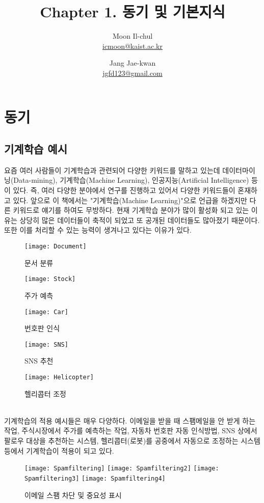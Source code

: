\documentclass[a4paper]{oblivoir}
\author{Moon Il-chul \\ \href{mailto:icmoon@kaist.ac.kr}{icmoon@kaist.ac.kr} 
   \and Jang Jae-kwan \\ \href{mailto:jgfd123@gmail.com}{jgfd123@gmail.com} }
\title{Chapter 1. 동기 및 기본지식}
\begin{document}
\maketitle
\tableofcontents

\section{동기}

\subsection{기계학습 예시}
요즘 여러 사람들이 기계학습과 관련되어 다양한 키워드를 말하고 있는데 데이터마이닝(Data-mining), 기계학습(Machine Learning), 인공지능(Artificial Intelligence) 등이 있다. 즉, 여러 다양한 분야에서 연구를 진행하고 있어서 다양한 키워드들이 혼재하고 있다. 앞으로 이 책에서는 "기계학습(Machine Learning)"으로 언급을 하겠지만 다른 키워드로 얘기를 하여도 무방하다. 현재 기계학습 분야가 많이 활성화 되고 있는 이유는 상당히 많은 데이터들이 축적이 되었고 또 공개된 데이터들도 많아졌기 때문이다. 또한 이를 처리할 수 있는 능력이 생겨나고 있다는 이유가 있다.\\
\begin{figure}[ht]\centering
\parbox[t]{3.5cm}{\texttt{[image: Document]}\caption{문서 분류\label{Fig:1-1}}}\hspace{2cm}
\parbox[t]{5cm}{\texttt{[image: Stock]}\caption{주가 예측\label{Fig:1-2}}}
\parbox[t]{3.5cm}{\texttt{[image: Car]}\caption{번호판 인식\label{Fig:1-3}}}\hspace{0.2cm}
\parbox[t]{5.5cm}{\texttt{[image: SNS]}\caption{SNS 추천\label{Fig:1-4}}}
\parbox[t]{2.5cm}{\texttt{[image: Helicopter]}\caption{헬리콥터 조정\label{Fig:1-5}}}
\end{figure}\\
\indent 기계학습의 적용 예시들은 매우 다양하다. 이메일을 받을 때 스팸메일을 안 받게 하는 작업, 주식시장에서 주가를 예측하는 작업, 자동차 번호판 자동 인식방법, SNS 상에서 팔로우 대상을 추천하는 시스템, 헬리콥터(로봇)를 공중에서 자동으로 조정하는 시스템 등에서 기계학습이 적용이 되고 있다. \\
\begin{figure}[ht]\centering
\texttt{[image: Spamfiltering]}\label{Fig:1-6}
\texttt{[image: Spamfiltering2]}\label{Fig:1-7}
\texttt{[image: Spamfiltering3]}\label{Fig:1-8}
\texttt{[image: Spamfiltering4]}\label{Fig:1-9}
\caption{이메일 스팸 차단 및 중요성 표시}
\end{figure}\\
\end{document}
